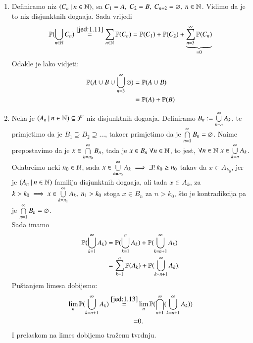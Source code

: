 \begin{rj}
    \begin{enumerate}[label=(\alph*)]
        \item Definiramo niz $({C_n} \: | \: {n \in \mathbb{N}})$, sa $C_1 = A, \; C_2 = B, \; C_{n + 2} = \varnothing, \; n \in \mathbb{N}$.
            Vidimo da je to niz disjunktnih doga\dj aja.
            Sada vrijedi
            \begin{equation*}
                \mathbb{P}({\bigcup\limits_{n \in \mathbb{N}}^{} C_n}) \overset{\eqref{jed:1.11}}{=} \sum\limits_{n \in \mathbb{N}}^{} \mathbb{P}({C_n}) = \mathbb{P}({C_1}) + \mathbb{P}({C_2}) + \underbrace{\sum\limits_{n = 3}^{\infty} \mathbb{P}({C_n})}_{=0}
            \end{equation*}
            Odakle je lako vidjeti:
            \begin{align*}
                \mathbb{P}({A \cup B \cup \bigcup\limits_{n = 3}^{\infty} \varnothing}) &= \mathbb{P}({A \cup B}) \\
                &= \mathbb{P}({A}) + \mathbb{P}({B})
            \end{align*}
        \item Neka je $({A_n} \: | \: {n \in \mathbb{N}}) \subseteq \mathcal{F}$ niz disjunktnih doga\dj aja.
        Definiramo $B_n := \bigcup\limits_{k = n}^{\infty} A_k$, te primjetimo da je $B_1 \supseteq B_2 \supseteq \dots$, tako\dj er primjetimo da je $\bigcap\limits_{n = 1}^{\infty} B_n = \varnothing$.
        Naime prepostavimo da je $x \in \bigcap\limits_{k = n_0}^{\infty} B_n$, tada je $x \in B_n \; \forall n \in \mathbb{N}$, to jest, $ \forall n \in \mathbb{N} \; x \in \bigcup\limits_{k = n}^{\infty} A_k$.
        Odabreimo neki $n_0 \in \mathbb{N}$, sada $x \in \bigcup\limits_{k = n_0}^{\infty} A_k \implies \exists ! \: k_0 \geq n_0$ takav da $x \in A_{k_0}$, jer je $({A_n} \: | \: {n \in \mathbb{N}})$ familija disjunktnih doga\dj aja, ali tada $x \in A_k$, za $k > k_0 \implies x  \in \bigcup\limits_{k = n_1}^{\infty} A_k, \; n_1 > k_0$ stoga $x \in B_n$ za $n > k_0$, \v sto je kontradikcija pa je $\bigcap\limits_{n = 1}^{\infty} B_n = \varnothing$.\\
        Sada imamo
        \begin{align*}
            \mathbb{P}({\bigcup\limits_{k = 1}^{\infty} A_k})
            &= \mathbb{P}({\bigcup\limits_{k = 1}^{n} A_k})
            + \mathbb{P}({\bigcup\limits_{k = n + 1}^{\infty} A_k}) \\
            &= \sum\limits_{k = 1}^{n} \mathbb{P}({A_k})
            + \mathbb{P}({\bigcup\limits_{k = n + 1}^{\infty} A_k}). 
        \end{align*}
        Pu\v stanjem limesa dobijemo:
        \begin{align*}
            \lim_n \mathbb{P}({\bigcup\limits_{k = n + 1}^{\infty} A_k})
            \overset{\eqref{jed:1.13}}{=}& \lim_n
            \mathbb{P}({\bigcap\limits_{n + 1}^{\infty}( \bigcup\limits_{k = n + 1}^{\infty} A_k)})\\
            =& 0.
            \end{align*}
        I prelaskom na limes dobijemo tra\v zenu tvrdnju.
    \end{enumerate}
\end{rj}


